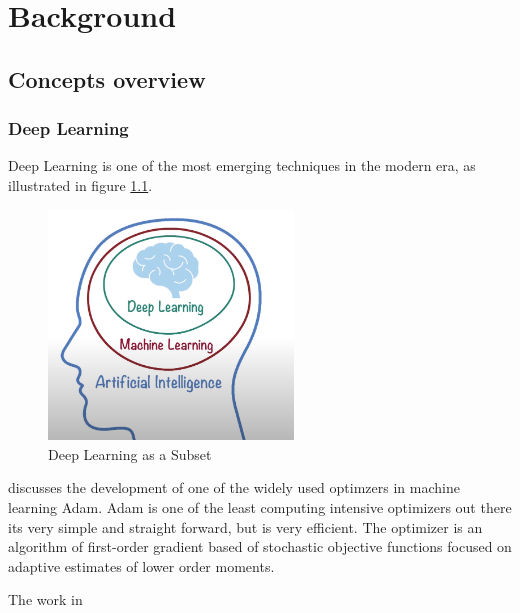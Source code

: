 \chapter{Background}
\label{chap:Two}
\section{Concepts overview} 
\label{sec:ConceptsOverview}
\subsection{Deep Learning}
\label{sec:DP}
Deep Learning is one of the most emerging techniques in the modern era, as illustrated in figure \ref{figure:DL}.
\begin{figure}[H]
\centering
\includegraphics[width=6.5cm]{Figures/DL.PNG}
\caption{Deep Learning as a Subset}
\label{figure:DL}
\end{figure}

  \cite{citeKey8} discusses the development of one of the widely used optimzers in machine learning Adam. Adam is one of the least computing intensive optimizers out there its very simple and straight forward, but is very efficient. The optimizer is an algorithm of first-order gradient based of stochastic objective functions focused on adaptive estimates of lower order moments.
  
  The work in \cite{citekey10}
    

